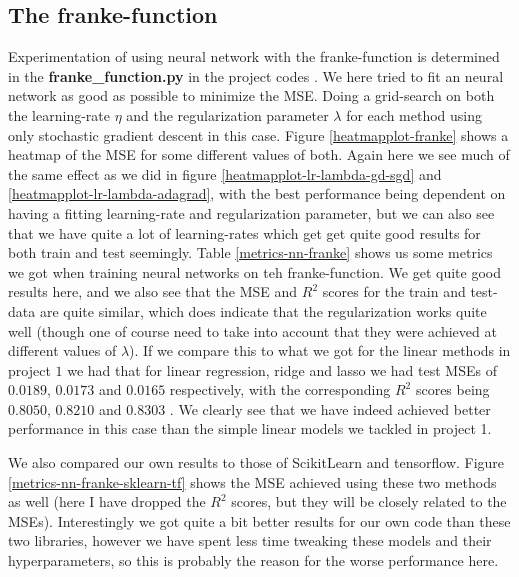 \documentclass{article}
\begin{document}
\subsection{The franke-function}
Experimentation of using neural network with the franke-function is determined
in the \textbf{franke\_function.py} in the project codes
\cite{githubrepoproject2code}. We here tried to fit an neural network as good as
possible to minimize the MSE. Doing a grid-search on both the learning-rate
$\eta$ and the regularization parameter $\lambda$ for each method using only
stochastic gradient descent in this case. Figure \ref{heatmapplot-franke} shows
a heatmap of the MSE for some different values of both. Again here we see much
of the same effect as we did in figure \ref{heatmapplot-lr-lambda-gd-sgd} and
\ref{heatmapplot-lr-lambda-adagrad}, with the best performance being dependent
on having a fitting learning-rate and regularization parameter, but we can also
see that we have quite a lot of learning-rates which get get quite good results
for both train and test seemingly. Table \ref{metrics-nn-franke} shows us some
metrics we got when training neural networks on teh franke-function. We get
quite good results here, and we also see that the MSE and $R^2$ scores for the
train and test-data are quite similar, which does indicate that the
regularization works quite well (though one of course need to take into account
that they were achieved at different values of $\lambda$). If we compare this to
what we got for the linear methods in project $1$ we had that for linear
regression, ridge and lasso we had test MSEs of $0.0189$, $0.0173$ and $0.0165$
respectively, with the corresponding $R^2$ scores being $0.8050$, $0.8210$ and
$0.8303$ \cite[s.~4.1]{reportproject1}. We clearly see that we have indeed
achieved better performance in this case than the simple linear models we
tackled in project 1.

We also compared our own results to those of ScikitLearn and tensorflow. Figure
\ref{metrics-nn-franke-sklearn-tf} shows the MSE achieved using these two
methods as well (here I have dropped the $R^2$ scores, but they will be closely
related to the MSEs).  Interestingly we got quite a bit better results for our
own code than these two libraries, however we have spent less time tweaking these
models and their hyperparameters, so this is probably the reason for the worse
performance here.
\end{document}
